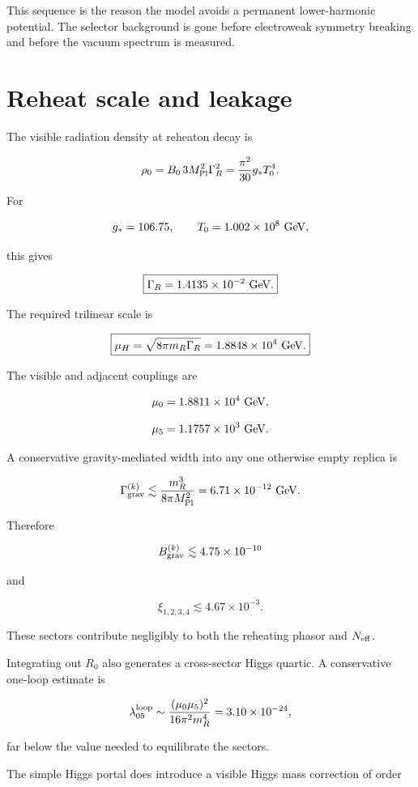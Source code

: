 \documentclass[
  10pt,
]{article}
\begin{document}
This sequence is the reason the model avoids a permanent lower-harmonic
potential. The selector background is gone before electroweak symmetry
breaking and before the vacuum spectrum is measured.

\section{Reheat scale and leakage}\label{reheat-scale-and-leakage}

The visible radiation density at reheaton decay is

\[
\rho_0
=
B_0\,3M_{\rm Pl}^2\Gamma_R^2
=
\frac{\pi^2}{30}g_*T_0^4.
\]

For

\[
g_*=106.75,
\qquad
T_0=1.002\times10^8\ {\rm GeV},
\]

this gives

\[
\boxed{
\Gamma_R=1.4135\times10^{-2}\ {\rm GeV}.
}
\]

The required trilinear scale is

\[
\boxed{
\mu_H
=
\sqrt{8\pi m_R\Gamma_R}
=1.8848\times10^4\ {\rm GeV}.
}
\]

The visible and adjacent couplings are

\[
\mu_0=1.8811\times10^4\ {\rm GeV},
\]

\[
\mu_5=1.1757\times10^3\ {\rm GeV}.
\]

A conservative gravity-mediated width into any one otherwise empty
replica is

\[
\Gamma_{\rm grav}^{(k)}
\lesssim
\frac{m_R^3}{8\pi M_{\rm Pl}^2}
=6.71\times10^{-12}\ {\rm GeV}.
\]

Therefore

\[
B_{\rm grav}^{(k)}
\lesssim4.75\times10^{-10}
\]

and

\[
\boxed{
\xi_{1,2,3,4}
\lesssim4.67\times10^{-3}.
}
\]

These sectors contribute negligibly to both the reheating phasor and
\(N_{\rm eff}\).

Integrating out \(R_0\) also generates a cross-sector Higgs quartic. A
conservative one-loop estimate is

\[
\lambda_{05}^{\rm loop}
\sim
\frac{(\mu_0\mu_5)^2}{16\pi^2m_R^4}
=3.10\times10^{-24},
\]

far below the value needed to equilibrate the sectors.

The simple Higgs portal does introduce a visible Higgs mass correction
of order
\end{document}
